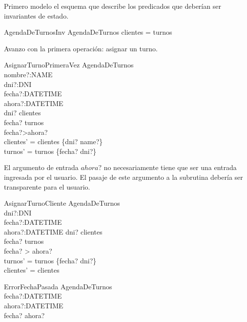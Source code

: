 \documentclass[%
  fleqn,colorlinks,linkcolor=blue,citecolor=blue,urlcolor=blue]{eptcs}
\begin{document}
  Primero modelo el esquema que describe los predicados que deber\'i{}an ser invariantes de estado.

  \begin{schema}{AgendaDeTurnosInv}
  AgendaDeTurnos
  \where
  \dom clientes = \ran turnos
  \end{schema}

  Avanzo con la primera operaci\'on: asignar un turno.

  \begin{schema}{AsignarTurnoPrimeraVez}
  \Delta AgendaDeTurnos \\
  nombre?:NAME \\
  dni?:DNI \\
  fecha?:DATETIME \\
  ahora?:DATETIME \\
  \where
  dni? \notin \dom clientes \\
  fecha? \notin \dom turnos \\
  fecha?>ahora? \\
  clientes' = clientes \cup \{dni? \mapsto name?\} \\
  turnos' = turnos \cup \{fecha? \mapsto dni?\} \\
  \end{schema}

  El argumento de entrada $ahora?$ no necesariamente tiene que ser una entrada ingresada por el usuario.
  El pasaje de este argumento a la subrutina deber\'i{}a ser transparente para el usuario.

  \begin{schema}{AsignarTurnoCliente}
  \Delta AgendaDeTurnos \\
  dni?:DNI \\
  fecha?:DATETIME \\
  ahora?:DATETIME
  \where
  dni? \in \dom clientes \\
  fecha? \notin \dom turnos \\
  fecha? > ahora? \\
  turnos' = turnos \cup \{fecha? \mapsto dni?\} \\
  clientes' = clientes \\
  \end{schema}

  \begin{schema}{ErrorFechaPasada}
  \Xi AgendaDeTurnos \\
  fecha?:DATETIME \\
  ahora?:DATETIME \\
  \where
  fecha? \leq ahora? \\
  \end{schema}
\end{document}
